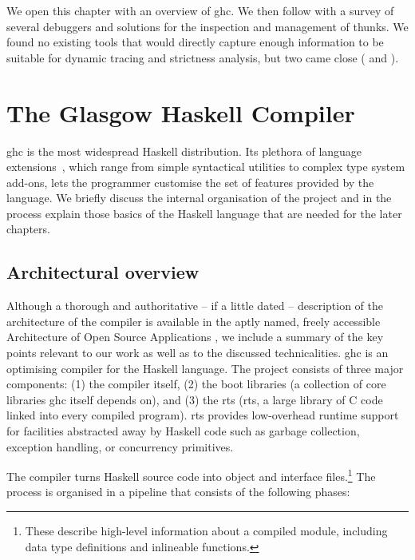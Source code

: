 \documentclass[thesis=B,english]{FITthesis}[2019/12/23]
\begin{document}
We open this chapter with an overview of \acrshort{ghc}. We then follow with a
survey of several debuggers and solutions for the inspection and management of
thunks. We found no existing tools that would directly capture enough
information to be suitable for dynamic tracing and strictness analysis, but two
came close ( and ).


\section{The Glasgow Haskell Compiler} \label{sec:ghc}
\acrshort{ghc} is the most widespread Haskell distribution. Its plethora of
language extensions~\cite{ghc-language-extensions}, which range from simple
syntactical utilities to complex type system add-ons, lets the programmer
customise the set of features provided by the language. We briefly discuss the
internal organisation of the project and in the process explain those basics of
the Haskell language that are needed for the later chapters.

\subsection{Architectural overview}
Although a thorough and authoritative -- if a little dated -- description of
the architecture of the compiler is available in the aptly named, freely
accessible Architecture of Open Source Applications \cite{arch-ghc}, we include
a summary of the key points relevant to our work as well as to the discussed
technicalities. \acrshort{ghc} is an optimising compiler for the Haskell
language. The project consists of three major components: (1) the compiler
itself, (2) the boot libraries (a collection of core libraries \acrshort{ghc}
itself depends on), and (3) the \acrlong{rts} (\acrshort{rts}, a large library
of C code linked into every compiled program). \acrshort{rts} provides
low-overhead runtime support for facilities abstracted away by Haskell code
such as garbage collection, exception handling, or concurrency primitives.

The compiler turns Haskell source code into object and interface
files.\footnote{
	These describe high-level information about a compiled module, including
	data type definitions and in\-line\-able functions.
} The process is organised in a pipeline that consists of the following phases:
\end{document}
